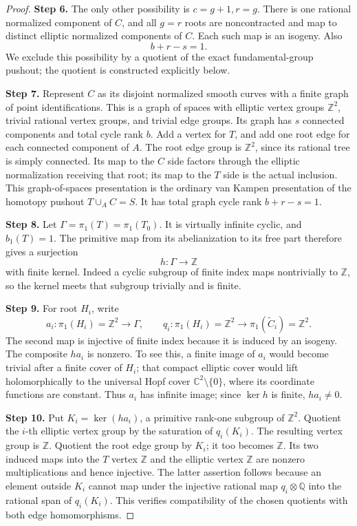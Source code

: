 \begin{proof}
\noindent\textbf{Step 6.} The only other possibility is \(c=g+1,r=g\). There is one rational
normalized component of \(C\), and all \(g=r\) roots are noncontracted and
map to distinct elliptic normalized components of \(C\). Each such map is
an isogeny. Also
\[
 b+r-s=1.
\]
We exclude this possibility by a quotient of the exact fundamental-group
pushout; the quotient is constructed explicitly below.

\noindent\textbf{Step 7.} Represent \(C\) as its disjoint normalized smooth curves with a finite
graph of point identifications. This is a graph of spaces with elliptic
vertex groups \(\mathbb Z^2\), trivial rational vertex groups, and trivial
edge groups. Its graph has \(s\) connected components and total cycle rank
\(b\). Add a vertex for \(T\), and add one root edge for each connected
component of \(A\). The root edge group is \(\mathbb Z^2\), since its
rational tree is simply connected. Its map to the \(C\) side factors
through the elliptic normalization receiving that root; its map to the
\(T\) side is the actual inclusion. This graph-of-spaces presentation is
the ordinary van Kampen presentation of the homotopy pushout
\(T\cup_A C=S\). It has total graph cycle rank \(b+r-s=1\).

\noindent\textbf{Step 8.} Let \(\Gamma=\pi_1(T)=\pi_1(T_0)\). It is virtually infinite cyclic, and
\(b_1(T)=1\). The primitive map from its abelianization to its free part
therefore gives a surjection
\[
 h:\Gamma\longrightarrow\mathbb Z
\]
with finite kernel. Indeed a cyclic subgroup of finite index maps
nontrivially to \(\mathbb Z\), so the kernel meets that subgroup trivially
and is finite.

\noindent\textbf{Step 9.} For root \(H_i\), write
\[
 a_i:\pi_1(H_i)=\mathbb Z^2\longrightarrow\Gamma,\qquad
 q_i:\pi_1(H_i)=\mathbb Z^2\longrightarrow
       \pi_1(\widetilde C_i)=\mathbb Z^2.
\]
The second map is injective of finite index because it is induced by an
isogeny. The composite \(h a_i\) is nonzero. To see this, a finite image
of \(a_i\) would become trivial after a finite cover of \(H_i\); that
compact elliptic cover would lift holomorphically to the universal Hopf
cover \(\mathbb C^2\setminus\{0\}\), where its coordinate functions are
constant. Thus \(a_i\) has infinite image; since \(\ker h\) is finite,
\(h a_i\ne0\).

\noindent\textbf{Step 10.} Put \(K_i=\ker(h a_i)\), a primitive rank-one subgroup of
\(\mathbb Z^2\). Quotient the \(i\)-th elliptic vertex group by the
saturation of \(q_i(K_i)\). The resulting vertex group is \(\mathbb Z\).
Quotient the root edge group by \(K_i\); it too becomes \(\mathbb Z\).
Its two induced maps into the \(T\) vertex \(\mathbb Z\) and the elliptic
vertex \(\mathbb Z\) are nonzero multiplications and hence injective.
The latter assertion follows because an element outside \(K_i\) cannot
map under the injective rational map \(q_i\otimes\mathbb Q\) into the
rational span of \(q_i(K_i)\). This verifies compatibility of the chosen
quotients with both edge homomorphisms.


\end{proof}

